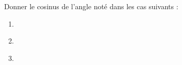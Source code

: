 
\begin{exercice}\label{exo2smath-0114}

Donner le cosinus de l'angle noté dans les cas suivants :
\begin{enumerate}
    \item
        
\begin{center}                                                                                            
                                                                 
\end{center}                                                                                                                             
\item

\begin{center}
   
\end{center}
\item

\begin{center}
   
\end{center}

\end{enumerate}


\end{exercice}
